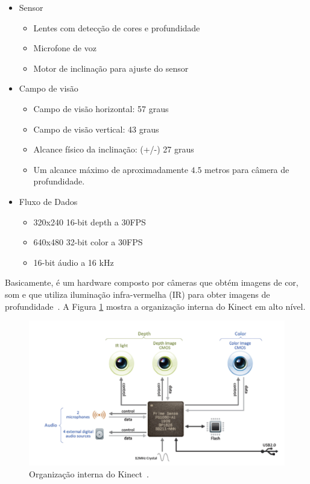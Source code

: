 	\begin{itemize}
		\item Sensor
			\begin{itemize}
				\item Lentes com detecção de cores e profundidade
				\item Microfone de voz
				\item Motor de inclinação para ajuste do sensor
			\end{itemize}
		\item Campo de visão
			\begin{itemize}
				\item Campo de visão horizontal: 57 graus
				\item Campo de visão vertical: 43 graus
				\item Alcance físico da inclinação: (+/-) 27 graus
				\item Um alcance máximo de aproximadamente $\displaystyle 4.5$ metros para câmera de profundidade. 
			\end{itemize}
		\item Fluxo de Dados
			\begin{itemize}
				\item 320x240 16-bit depth a 30FPS
				\item 640x480 32-bit color a 30FPS
				\item 16-bit áudio a 16 kHz
			\end{itemize}
	\end{itemize}

Basicamente, é um hardware composto por câmeras que obtém imagens de cor, som e que utiliza iluminação infra-vermelha (IR) para obter imagens de profundidade~\cite{kinect}. A Figura \ref{kinect_interno} mostra a organização interna do Kinect em alto nível.

	\begin{figure}[hbt]
		\begin{center}
			\includegraphics[scale=0.8]{figuras/2.FundamentacaoTeorica/kinect_interno.png}
		\end{center}
		\caption{Organização interna do Kinect~\cite{kinect}.}
		\label{kinect_interno}
	\end{figure}

